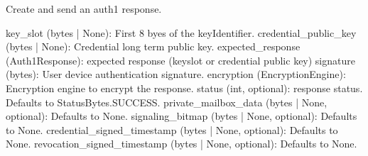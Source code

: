 \documentclass[letterpaper,10pt,english]{sphinxmanual}
\begin{document}
\begin{fulllineitems}
\begin{fulllineitems}
\label{\detokenize{aliro_actuator.access_protocol.user_device:aliro_actuator.access_protocol.user_device.UserDevice.response_auth1}}
\pysigstartsignatures
{}
\pysigstopsignatures
\sphinxAtStartPar
Create and send an auth1 response.
\begin{description}
\sphinxAtStartPar
key\_slot (bytes | None): First 8 byes of the keyIdentifier.
credential\_public\_key (bytes | None): Credential long term public key.
expected\_response (Auth1Response): expected response (keyslot or
credential public key)
signature (bytes): User device authentication signature.
encryption (EncryptionEngine): Encryption engine to encrypt the response.
status (int, optional): response status. Defaults to StatusBytes.SUCCESS.
private\_mailbox\_data (bytes | None, optional): Defaults to None.
signaling\_bitmap (bytes | None, optional): Defaults to None.
credential\_signed\_timestamp (bytes | None, optional): Defaults to None.
revocation\_signed\_timestamp (bytes | None, optional): Defaults to None.


\end{description}
\end{fulllineitems}
\end{fulllineitems}
\end{document}
